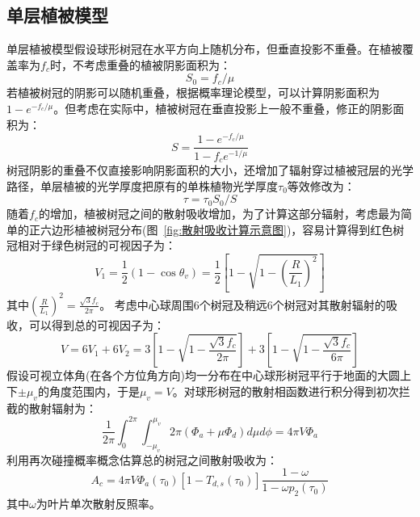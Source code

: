 \subsection{单层植被模型}
单层植被模型假设球形树冠在水平方向上随机分布，但垂直投影不重叠。在植被覆盖率为$f_c$时，不考虑重叠的植被阴影面积为：
\begin{equation}
S_{0}=f_{c} / \mu
\end{equation}
若植被树冠的阴影可以随机重叠，根据概率理论模型，可以计算阴影面积为$1-e^{-f_c/\mu}$。但考虑在实际中，植被树冠在垂直投影上一般不重叠，修正的阴影面积为：
\begin{equation}\label{S_area}
S=\frac{1-e^{-f_{c} / \mu}}{1-f_{c} e^{-1 / \mu}}
\end{equation}
树冠阴影的重叠不仅直接影响阴影面积的大小，还增加了辐射穿过植被冠层的光学路径，单层植被的光学厚度把原有的单株植物光学厚度$\tau_0$等效修改为：
\begin{equation}\label{tau}
\tau=\tau_{0} S_{0} / S
\end{equation}
随着$f_c$的增加，植被树冠之间的散射吸收增加，为了计算这部分辐射，考虑最为简单的正六边形植被树冠分布(图~\ref{fig:散射吸收计算示意图})，容易计算得到红色树冠相对于绿色树冠的可视因子为：
\begin{equation}
V_{1}=\frac{1}{2}\left(1-\cos \theta_{v}\right)=\frac{1}{2}\left[1-\sqrt{1-\left(\frac{R}{L_{1}}\right)^{2}}\right]
\end{equation}
其中$\left(\frac{R}{L_{1}}\right)^{2}=\frac{\sqrt{3} f_{c}}{2 \pi}$。
考虑中心球周围6个树冠及稍远6个树冠对其散射辐射的吸收，可以得到总的可视因子为：
\begin{equation}
V=6 V_{1}+6 V_{2}=3\left[1-\sqrt{1-\frac{\sqrt{3} f_{c}}{2 \pi}}\right]+3\left[1-\sqrt{1-\frac{\sqrt{3} f_{c}}{6 \pi}}\right]
\end{equation}
假设可视立体角(在各个方位角方向)均一分布在中心球形树冠平行于地面的大圆上下$\pm\mu_v$的角度范围内，于是$\mu_v=V$。对球形树冠的散射相函数进行积分得到初次拦截的散射辐射为：
\begin{equation}
\frac{1}{2 \pi} \int_{0}^{2 \pi} \int_{-\mu_{v}}^{\mu_{v}} 2 \pi\left(\Phi_{a}+\mu \Phi_{d}\right) d \mu d \phi=4 \pi V \Phi_{a}
\end{equation}
利用再次碰撞概率概念估算总的树冠之间散射吸收为：
\begin{equation}
A_{c}=4 \pi V \Phi_{a}\left(\tau_{0}\right)\left[1-T_{d, s}\left(\tau_{0}\right)\right] \frac{1-\omega}{1-\omega p_{2}\left(\tau_{0}\right)}
\end{equation}
其中$\omega$为叶片单次散射反照率。

